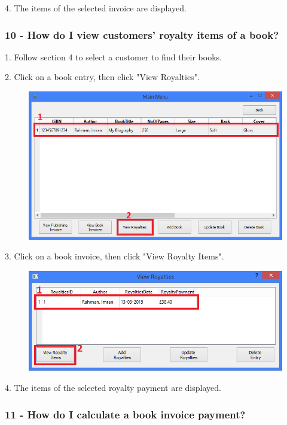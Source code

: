 4. The items of the selected invoice are displayed.

\subsubsection{10 -  How do I view customers' royalty items of a book?} \label{sssec:Q10}

1. Follow section 4 to select a customer to find their books.

2. Click on a book entry, then click "View Royalties".

\begin{figure}[H]
    \includegraphics[width=\textwidth]{./Manual/Tutorial/Q10/ViewRoyalties.png}
\end{figure}

3. Click on a book invoice, then click "View Royalty Items".

\begin{figure}[H]
    \includegraphics[width=\textwidth]{./Manual/Tutorial/Q10/ViewRoyaltyItems.png}
\end{figure}

4. The items of the selected royalty payment are displayed.

\subsubsection{11 - How do I calculate a book invoice payment?} \label{sssec:Q11}

